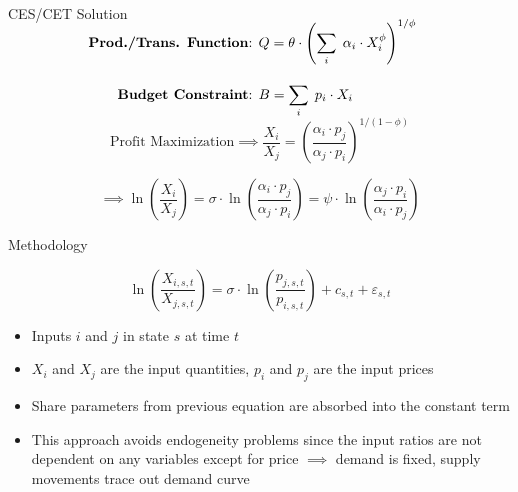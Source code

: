 \documentclass[11pt,aspectratio=169]{beamer}
\begin{document}
\begin{frame}{CES/CET Solution}


	\vspace{0.5em}

	\begin{block}{}
		\large \begin{align*}
		\\[-3em] \text{\textbf{Prod./Trans. Function}: } &Q = \theta \cdot \left( \sum_i \; \alpha_i \cdot X_i^\phi \right)^{1/\phi} \\[1em]
		\text{\textbf{Budget Constraint}: } &B = \sum_i \;p_i \cdot  X_i \\[-2.5em]
		\end{align*}
	\end{block}

	\vspace{-1em}
\
	$$\text{Profit Maximization} \implies \frac{X_i}{X_j} = \left(\frac{\alpha_i \cdot p_j}{\alpha_j \cdot p_i}\right)^{1/(1-\phi)}$$
	
	$$\implies \ln\left(\frac{X_i}{X_j}\right) = \sigma \cdot \ln\left(\frac{\alpha_i \cdot p_j}{\alpha_j \cdot p_i}\right) = \psi \cdot \ln\left(\frac{\alpha_j \cdot p_i}{\alpha_i \cdot p_j}\right) $$

\end{frame}


\begin{frame}{Methodology}

	
	\vspace{0.5em}
	
	\begin{block}{}
	$$\ln\left(\frac{X_{i,s,t}}{X_{j,s,t}}\right) = \sigma \cdot \ln\left(\frac{ p_{j,s,t}}{ p_{i,s,t}}\right) + c_{s,t} + \varepsilon_{s,t}$$
	\end{block}
	
	\vspace{-0em}
	
		\begin{itemize}
			
		
			\item Inputs $i$ and $j$ in state $s$ at time $t$
			
			\item $X_i$ and $X_j$ are the input quantities, $p_i$ and $p_j$ are the input prices
			
			\item Share parameters from previous equation are absorbed into the constant term
			
			\item This approach avoids endogeneity problems since the input ratios are not dependent on any variables except for price $\implies$ demand is fixed, supply movements trace out demand curve
			
		\end{itemize}

\end{frame}
\end{document}
